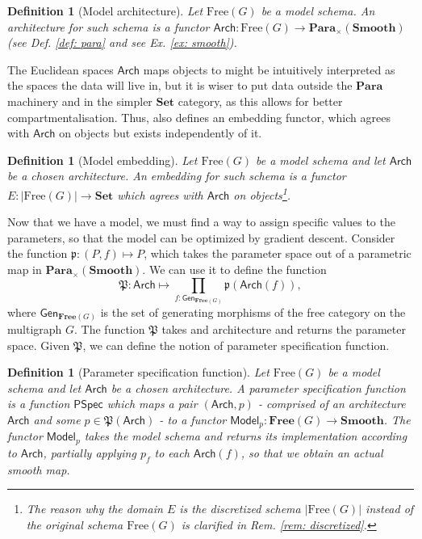 \documentclass[11pt,a4paper,openright,twoside]{report}
\newcounter{mycounter}
\theoremstyle{plain}
\newtheorem{definition}[mycounter]{Definition}
\theoremstyle{definition}
\begin{document}
\begin{definition}[Model architecture]
  Let $\mathrm{Free}(G)$ be a model schema. An architecture for such schema is a functor $\mathsf{Arch}: \mathrm{Free}(G) \to \mathbf{Para}_{\times}(\mathbf{Smooth})$ (see \textit{Def. \ref{def: para}} and see \textit{Ex. \ref{ex: smooth}}).
\end{definition}

The Euclidean spaces $\mathsf{Arch}$ maps objects to might be intuitively interpreted as the spaces the data will live in, but it is wiser to put data outside the $\mathbf{Para}$ machinery and in the simpler $\mathbf{Set}$ category, as this allows for better compartmentalisation. Thus, \cite{gavranovic2019compositional} also defines an embedding functor, which agrees with $\mathsf{Arch}$ on objects but exists independently of it.


\begin{definition}[Model embedding]
  Let $\mathrm{Free}(G)$ be a model schema and let $\mathsf{Arch}$ be a chosen architecture. An embedding for such schema is a functor $E: |\mathrm{Free}(G)| \to \mathbf{Set}$ which agrees with $\mathsf{Arch}$ on objects\footnote{The reason why the domain $E$ is the discretized schema $|\mathrm{Free}(G)|$ instead of the original schema $\mathrm{Free}(G)$ is clarified in \textit{Rem. \ref{rem: discretized}}.}.
\end{definition}

Now that we have a model, we must find a way to assign specific values to the parameters, so that the model can be optimized by gradient descent. Consider the function $\mathfrak{p}: (P,f) \mapsto P$, which takes the parameter space out of a parametric map in $\mathbf{Para}_{\times}(\mathbf{Smooth})$. We can use it to define the function 
\[\mathfrak{P}: \mathsf{Arch} \mapsto \prod_{f : \mathsf{Gen}_{\mathbf{Free}(G)}}\mathfrak{p}(\mathsf{Arch}(f)),\]
where $\mathsf{Gen}_{\mathbf{Free}(G)}$ is the set of generating morphisms of the free category on the multigraph $G$. The function $\mathfrak{P}$ takes and architecture and returns the parameter space. Given $\mathfrak{P}$, we can define the notion of parameter specification function.

\begin{definition}[Parameter specification function]
  Let $\mathrm{Free}(G)$ be a model schema and let $\mathsf{Arch}$ be a chosen architecture. A parameter specification function is a function $\mathsf{PSpec}$ which maps a pair $(\mathsf{Arch}, p)$ - comprised of an architecture $\mathsf{Arch}$ and some $p \in \mathfrak{P}(\mathsf{Arch})$ - to a functor $\mathsf{Model}_p: \mathbf{Free}(G) \to \mathbf{Smooth}$. The functor $\mathsf{Model}_p$ takes the model schema and returns its implementation according to $\mathsf{Arch}$, partially applying $p_f$ to each $\mathsf{Arch}(f)$, so that we obtain an actual smooth map. 
\end{definition}
\end{document}
